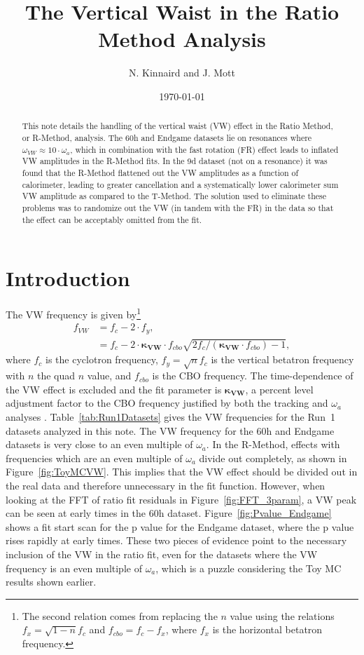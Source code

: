 \documentclass[12pt,letterpaper]{article}
\title{The Vertical Waist in the Ratio Method Analysis}
\author{N. Kinnaird and J. Mott}
\date{\today}
\newcommand{\figref}[1]{Figure~\ref{#1}}
\def\wa{$\omega_{a}$\xspace}
\begin{document}
\maketitle

\begin{abstract}
This note details the handling of the vertical waist (VW) effect in the Ratio Method, or R-Method, analysis. The 60h and Endgame datasets lie on resonances where $\omega_{VW} \approx 10 \cdot \omega_{a}$, which in combination with the fast rotation (FR) effect leads to inflated VW amplitudes in the R-Method fits. In the 9d dataset (not on a resonance) it was found that the R-Method flattened out the VW amplitudes as a function of calorimeter, leading to greater cancellation and a systematically lower calorimeter sum VW amplitude as compared to the T-Method. The solution used to eliminate these problems was to randomize out the VW (in tandem with the FR) in the data so that the effect can be acceptably omitted from the fit.
\end{abstract}


\section{Introduction}

The VW frequency is given by\footnote{The second relation comes from replacing the $n$ value using the relations $f_{x} = \sqrt{1-n}f_{c}$ and $f_{cbo} = f_{c}-f_{x}$, where $f_{x}$ is the horizontal betatron frequency.}
    \begin{align} \label{eq:VWfreqKappa}
        f_{VW} &= f_{c} - 2 \cdot f_{y}, \\
               &= f_{c} - 2 \cdot \boldsymbol{\kappa_{VW}} \cdot f_{cbo}\sqrt{2f_{c}/(\boldsymbol{\kappa_{VW}} \cdot f_{cbo})-1},
    \end{align}
where $f_{c}$ is the cyclotron frequency, $f_{y} = \sqrt{n}f_{c}$ is the vertical betatron frequency with $n$ the quad $n$ value, and $f_{cbo}$ is the CBO frequency. The time-dependence of the VW effect is excluded and the fit parameter is $\boldsymbol{\kappa_{VW}}$, a percent level adjustment factor to the CBO frequency justified by both the tracking and \wa analyses \cite{cbofrequency}. Table~\ref{tab:Run1Datasets} gives the VW frequencies for the Run~1 datasets analyzed in this note. The VW frequency for the 60h and Endgame datasets is very close to an even multiple of \wa. In the R-Method, effects with frequencies which are an even multiple of \wa divide out completely, as shown in \figref{fig:ToyMCVW}. This implies that the VW effect should be divided out in the real data and therefore unnecessary in the fit function. However, when looking at the FFT of ratio fit residuals in \figref{fig:FFT_3param}, a VW peak can be seen at early times in the 60h dataset. \figref{fig:Pvalue_Endgame} shows a fit start scan for the p value for the Endgame dataset, where the p value rises rapidly at early times. These two pieces of evidence point to the necessary inclusion of the VW in the ratio fit, even for the datasets where the VW frequency is an even multiple of \wa, which is a puzzle considering the Toy MC results shown earlier.
\end{document}
